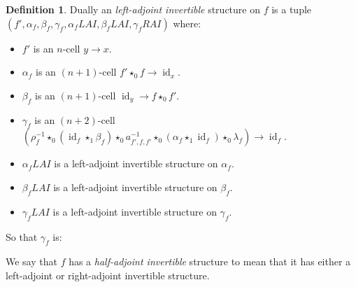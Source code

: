 \documentclass{article}
\theoremstyle{definition}
\newtheorem{definition}{Definition}
\theoremstyle{remark}
\DeclareMathOperator{\id}{id}
\newcommand{\inv}[1]{#1^{-1}}
\newcommand{\comp}{\star}
\begin{document}
\begin{definition}
  Dually an \emph{left-adjoint invertible} structure on \(f\) is a tuple \((f', \alpha_f, \beta_f, \gamma_f, \alpha_f{}LAI, \beta_f{}LAI, \gamma_f{}RAI)\) where:
  \begin{itemize}
  \item \(f'\) is an \(n\)-cell \(y \to x\).
  \item \(\alpha_f\) is an \((n+1)\)-cell \(f' \comp_0 f \to \id_x\).
  \item \(\beta_f\) is an \((n+1)\)-cell \(\id_y \to f \comp_0 f'\).
  \item \(\gamma_f\) is an \((n+2)\)-cell \((\rho_{f}^{-1} \comp_0 (\id_{f} \comp_1 \beta_f) \comp_0 \inv {a_{f',f,f'}} \comp_0 (\alpha_f \comp_1 \id_f) \comp_0 \lambda_f) \to \id_f\).
  \item \(\alpha_f{}LAI\) is a left-adjoint invertible structure on \(\alpha_f\).
  \item \(\beta_f{}LAI\) is a left-adjoint invertible structure on \(\beta_f\).
  \item \(\gamma_f{}LAI\) is a left-adjoint invertible structure on \(\gamma_f\).
  \end{itemize}

  So that \(\gamma_f\) is:
  \begin{center}
  \end{center}

  We say that \(f\) has a \emph{half-adjoint invertible} structure to mean that it has either a left-adjoint or right-adjoint invertible structure.
\end{definition}
\end{document}
